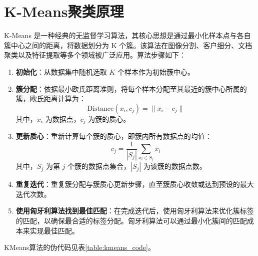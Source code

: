 \documentclass[master]{thesis-uestc}
\begin{document}
\section{K-Means聚类原理}
K-Means 是一种经典的无监督学习算法，其核心思想是通过最小化样本点与各自簇中心之间的距离，将数据划分为 K 个簇。该算法在图像分割、客户细分、文档聚类以及特征提取等多个领域被广泛应用。算法步骤如下：
\begin{enumerate}[label={(\arabic*)}]
    \item \textbf{初始化}：从数据集中随机选取 \(K\) 个样本作为初始簇中心。
    \item \textbf{簇分配}：依据最小欧氏距离准则，将每个样本分配至其最近的簇中心所属的簇，欧氏距离计算为：
    \[
    \text{Distance}(x_i, c_j) = \| x_i - c_j \|
    \]
    其中，\(x_i\) 为数据点，\(c_j\) 为簇的质心。
    \item \textbf{更新质心}：重新计算每个簇的质心，即簇内所有数据点的均值：
    \[
    c_j = \frac{1}{|S_j|} \sum_{x_i \in S_j} x_i
    \]
    其中，\(S_j\) 为第 \(j\) 个簇的数据点集合，\(|S_j|\) 为该簇的数据点数。
    \item \textbf{重复迭代}：重复簇分配与簇质心更新步骤，直至簇质心收敛或达到预设的最大迭代次数。 
    \item \textbf{使用匈牙利算法找到最佳匹配}：在完成迭代后，使用匈牙利算法来优化簇标签的匹配，以确保最合适的标签分配。匈牙利算法可以通过最小化簇间的匹配成本来实现最佳匹配。
\end{enumerate}
KMeans算法的伪代码见表\ref{table:kmeans_code}。
\end{document}
